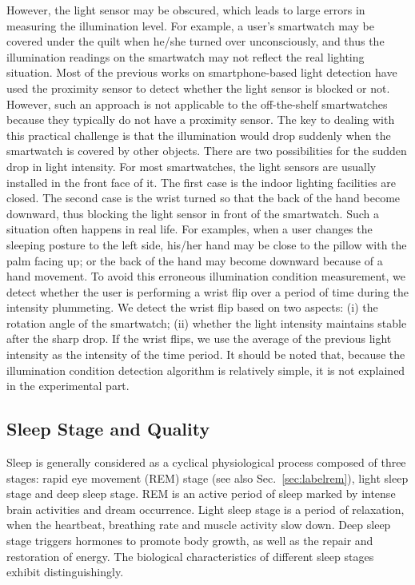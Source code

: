 However, the light sensor may be obscured, which leads to large errors in measuring the illumination level. For example, a user's
smartwatch may be covered under the quilt when he/she turned over unconsciously, and thus the illumination readings on the smartwatch may
not reflect the real lighting situation. Most of the previous works on smartphone-based light detection have used the proximity sensor to
detect whether the light sensor is blocked or not. However, such an approach is not applicable to the off-the-shelf smartwatches because
they typically do not have a proximity sensor.  The key to dealing with this practical challenge is that the illumination would drop suddenly
when the smartwatch is covered by other objects. There are two possibilities for the sudden drop in light intensity. For most smartwatches,
the light sensors are usually installed in the front face of it. The first case is the indoor lighting facilities are closed. The second
case is the wrist turned so that the back of the hand become downward, thus blocking the light sensor in front of the smartwatch. Such a
situation often happens in real life. For examples, when a user changes the sleeping posture to the left side, his/her hand may be close to
the pillow with the palm facing up; or the back of the hand may become downward because of a hand movement. To avoid this erroneous
illumination condition measurement, we detect whether the user is performing a wrist flip over a period of time during the intensity
plummeting. We detect the wrist flip based on two aspects: (i) the rotation angle of the smartwatch; (ii) whether the light intensity
maintains stable after the sharp drop. If the wrist flips, we use the average of the previous light intensity as the intensity of the time
period. It should be noted that, because the illumination condition detection algorithm is relatively simple, it is not explained in the
experimental part.

\subsection{Sleep Stage and Quality}

Sleep is generally considered as a cyclical physiological process composed of three stages: rapid eye movement (REM) stage (see also
Sec.~\ref{sec:labelrem}), light sleep stage and deep sleep stage. REM is an active period of sleep marked by intense brain activities and
dream occurrence. Light sleep stage is a period of relaxation, when the heartbeat, breathing rate and muscle activity slow down. Deep sleep
stage triggers hormones to promote body growth, as well as the repair and restoration of energy.  The biological characteristics of
different sleep stages exhibit distinguishingly.

